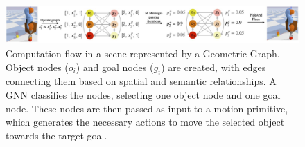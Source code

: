\begin{figure}[t]
    \centering
    \includegraphics[width=1\textwidth]{figures/images/ch4/geometric_graph_computation.jpg}
    \caption{Computation flow in a scene represented by a Geometric Graph. Object nodes ($o_{i}$) and goal nodes ($g_{i}$) are created, with edges connecting them based on spatial and semantic relationships. A GNN classifies the nodes, selecting one object node and one goal node. These nodes are then passed as input to a motion primitive, which generates the necessary actions to move the selected object towards the target goal.}
    \label{fig:geometric_graph_computation}
\end{figure}
